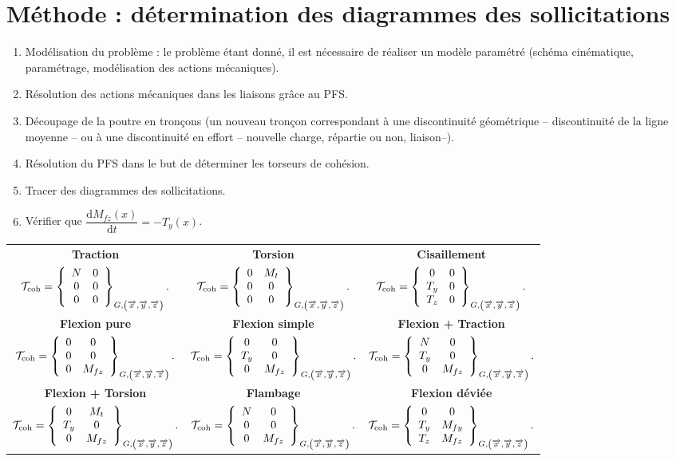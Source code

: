 \documentclass[10pt,fleqn]{article} %
\begin{document}
\section{Méthode : détermination des diagrammes des sollicitations}
\begin{enumerate}
\item Modélisation du problème : le problème étant donné, il est nécessaire de réaliser un modèle paramétré (schéma cinématique, paramétrage, modélisation des actions mécaniques). 
\item Résolution des actions mécaniques dans les liaisons grâce au PFS. 
\item Découpage de la poutre en tronçons (un nouveau tronçon correspondant à une discontinuité géométrique -- discontinuité de la ligne moyenne -- ou à une discontinuité en effort -- nouvelle charge, répartie ou non, liaison--).
\item Résolution du PFS dans le but de déterminer les torseurs de cohésion.
\item Tracer des diagrammes des sollicitations.
\item Vérifier que $\dfrac{\text{d}M_{fz}(x)}{\text{d}t}=-T_y(x)$.
\end{enumerate}

\begin{center}
\begin{tabular}{|c|c|c|}
\hline
\textbf{Traction} & \textbf{Torsion} & \textbf{Cisaillement} \\
$
\mathcal{T}_{\text{coh}} = \torseurcol{N}{0}{0}{0}{0}{0}{G,\left(\vx{}, \vy{}, \vz{} \right)}.
$
&
$
\mathcal{T}_{\text{coh}} = \torseurcol{0}{0}{0}{M_t}{0}{0}{G,\left(\vx{}, \vy{}, \vz{} \right)}.
$
&
$
\mathcal{T}_{\text{coh}} = \torseurcol{0}{T_y}{T_z}{0}{0}{0}{G,\left(\vx{}, \vy{}, \vz{} \right)}.
$ \\
\hline
\hline
\textbf{Flexion pure} & \textbf{Flexion simple} & \textbf{Flexion + Traction} \\
$
\mathcal{T}_{\text{coh}} = \torseurcol{0}{0}{0}{0}{0}{M_{fz}}{G,\left(\vx{}, \vy{}, \vz{} \right)}.
$
&
$
\mathcal{T}_{\text{coh}} = \torseurcol{0}{T_y}{0}{0}{0}{M_{fz}}{G,\left(\vx{}, \vy{}, \vz{} \right)}.
$
&
$
\mathcal{T}_{\text{coh}} = \torseurcol{N}{T_y}{0}{0}{0}{M_{fz}}{G,\left(\vx{}, \vy{}, \vz{} \right)}.
$ \\
\hline
\hline
\textbf{Flexion + Torsion} & \textbf{Flambage} & \textbf{Flexion déviée} \\
$
\mathcal{T}_{\text{coh}} = \torseurcol{0}{T_y}{0}{M_t}{0}{M_{fz}}{G,\left(\vx{}, \vy{}, \vz{} \right)}.
$
&
$
\mathcal{T}_{\text{coh}} = \torseurcol{N}{0}{0}{0}{0}{M_{fz}}{G,\left(\vx{}, \vy{}, \vz{} \right)}.
$
&
$
\mathcal{T}_{\text{coh}} = \torseurcol{0}{T_y}{T_z}{0}{M_{fy}}{M_{fz}}{G,\left(\vx{}, \vy{}, \vz{} \right)}.
$ \\
\hline
\end{tabular}
\end{center}
\end{document}
